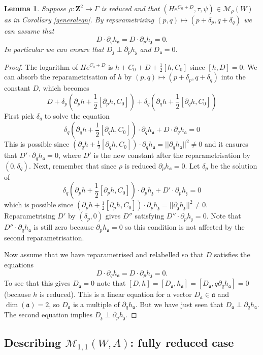 \documentclass[11pt]{amsart}
\newcommand{\mM}{\mathcal{M}}
\newcommand{\ZZ}{\mathbf{Z}}
\newcommand{\WW}{W}
\renewcommand{\aa}{\mathfrak{a}}
\newcommand{\zz}{\mathfrak{z}}
\numberwithin{equation}{section}
\newtheorem{lma}[equation]{Lemma}
\theoremstyle{definition}
\theoremstyle{remark}
\begin{document}
\begin{lma}\label{translwlog}
Suppose $\rho\colon\ZZ^2\to\Gamma$ is reduced and that $(He^{C_0+D},\tau,\psi)\in\mM_{\rho}(\WW)$ as in Corollary \ref{generaleqn}. By reparametrising $(p,q)\mapsto (p+\delta_p,q+\delta_q)$ we can assume that
\[D\cdot\partial_qh_{\aa}=D\cdot\partial_ph_{\zz}=0.\]
In particular we can ensure that $D_{\zz}\perp\partial_ph_{\zz}$ and $D_{\aa}=0$.
\end{lma}
\begin{proof}
The logarithm of $He^{C_0+D}$ is $h+C_0+D+\frac{1}{2}[h,C_0]$ since $[h,D]=0$. We can absorb the reparametrisation of $h$ by $(p,q)\mapsto(p+\delta_p,q+\delta_q)$ into the constant $D$, which becomes
\[D+\delta_p\left(\partial_ph+\frac{1}{2}[\partial_ph,C_0]\right)+\delta_q\left(\partial_qh+\frac{1}{2}[\partial_qh,C_0]\right)\]
First pick $\delta_q$ to solve the equation
\[\delta_q\left(\partial_qh+\frac{1}{2}[\partial_qh,C_0]\right)\cdot\partial_qh_{\aa}+D\cdot\partial_qh_{\aa}=0\]
This is possible since $\left(\partial_qh+\frac{1}{2}[\partial_qh,C_0]\right)\cdot\partial_qh_{\aa}=||\partial_qh_{\aa}||^2\neq 0$ and it ensures that $D'\cdot\partial_qh_{\aa}=0$, where $D'$ is the new constant after the reparametrisation by $(0,\delta_q)$. Next, remember that since $\rho$ is reduced $\partial_ph_{\aa}=0$. Let $\delta_p$ be the solution of
\[\delta_q\left(\partial_ph+\frac{1}{2}[\partial_ph,C_0]\right)\cdot\partial_ph_{\zz}+D'\cdot\partial_ph_{\zz}=0\]
which is possible since $\left(\partial_ph+\frac{1}{2}[\partial_ph,C_0]\right)\cdot\partial_ph_{\zz}=||\partial_{\zz}h_{\zz}||^2\neq 0$. Repara\-met\-ri\-sing $D'$ by $(\delta_p,0)$ gives $D''$ satisfying $D''\cdot\partial_ph_{\zz}=0$. Note that $D''\cdot\partial_qh_{\aa}$ is still zero because $\partial_ph_{\aa}=0$ so this condition is not affected by the second reparametrisation.

Now assume that we have reparametrised and relabelled so that $D$ satisfies the equations
\[D\cdot\partial_qh_{\aa}=D\cdot\partial_ph_{\zz}=0.\]
To see that this gives $D_{\aa}=0$ note that $[D,h]=[D_{\aa},h_{\aa}]=[D_{\aa},q\partial_qh_{\aa}]=0$ (because $h$ is reduced). This is a linear equation for a vector $D_{\aa}\in\aa$ and $\dim(\aa)=2$, so $D_{\aa}$ is a multiple of $\partial_qh_{\aa}$. But we have just seen that $D_{\aa}\perp\partial_qh_{\aa}$. The second equation implies $D_{\zz}\perp\partial_ph_{\zz}$.
\end{proof}

\subsection{Describing $\mM_{1,1}(\WW,A)$: fully reduced case}
\end{document}
